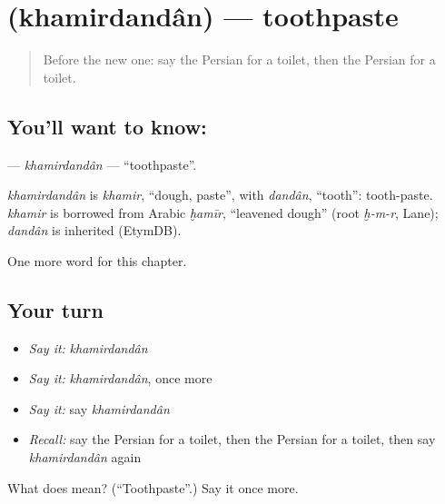 \section[\texorpdfstring{\fa{خمیردندان} (khamirdandân)}{خمیردندان (khamirdandân)}]{ (khamirdandân) — toothpaste}

\label{lesson:FA-C165-khamirdandan}



\begin{quote}
Before the new one: say the Persian for a toilet, then the Persian for a toilet.
\end{quote}

\subsection*{You'll want to know: }
\textbf{} — \emph{khamirdandân} — \textquotedblleft{}toothpaste\textquotedblright{}.

\begin{cousinweb}
\emph{khamirdandân} is \emph{khamir}, \textquotedblleft{}dough, paste\textquotedblright{}, with \emph{dandân}, \textquotedblleft{}tooth\textquotedblright{}: tooth-paste. \emph{khamir} is borrowed from Arabic \emph{ḫamīr}, \textquotedblleft{}leavened dough\textquotedblright{} (root \emph{ḫ-m-r}, Lane); \emph{dandân} is inherited (EtymDB).
\end{cousinweb}

\begin{grammarlens}[title={What you've built}]
One more word for this chapter.
\end{grammarlens}

\subsection*{Your turn}
\begin{itemize}
\raggedright
  \item \emph{Say it:} \emph{khamirdandân}
  \item \emph{Say it:} \emph{khamirdandân}, once more
  \item \emph{Say it:} say \emph{khamirdandân}
  \item \emph{Recall:} say the Persian for a toilet, then the Persian for a toilet, then say \emph{khamirdandân} again
\end{itemize}

\begin{tcolorbox}[breakable,colback=teal!4,colframe=teal!35!black,title={Before you move on}]
What does  mean? (\textquotedblleft{}Toothpaste\textquotedblright{}.) Say it once more.
\end{tcolorbox}
